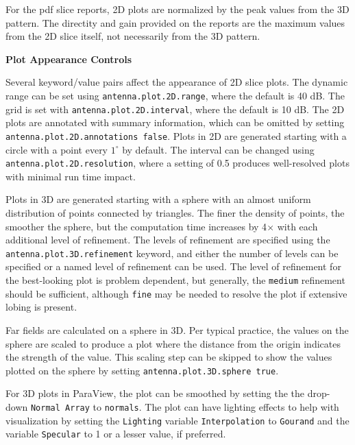 \documentclass[titlepage]{article}
\renewcommand\_{\textunderscore\linebreak[1]}
\begin{document}
For the pdf slice reports, 2D plots are normalized by the peak values from the 3D pattern.  The directity and gain provided on the reports are the maximum values from the 2D slice itself, not necessarily from the 3D pattern.\newline

\noindent \textbf{Plot Appearance Controls}\newline

Several keyword/value pairs affect the appearance of 2D slice plots.  The dynamic range can be set using \texttt{antenna.plot.2D.range}, where the default is 40 dB.  The grid is set with \texttt{antenna.plot.2D.interval}, where the default is 10 dB.  The 2D plots are annotated with summary information, which can be omitted by setting \texttt{antenna.plot.2D.annotations false}. Plots in 2D are generated starting with a circle with a point every $1^\circ$ by default.  The interval can be changed using \texttt{antenna.plot.2D.resolution}, where a setting of 0.5 produces well-resolved plots with minimal run time impact.

Plots in 3D are generated starting with a sphere with an almost uniform distribution of points connected by triangles.  The finer the density of points, the smoother the sphere, but the computation time increases by 4$\times$ with each additional level of refinement.  The levels of refinement are specified using the \texttt{antenna.plot.3D.refinement} keyword, and either the number of levels can be specified or a named level of refinement can be used.  The level of refinement for the best-looking plot is problem dependent, but generally, the \texttt{medium} refinement should be sufficient, although \texttt{fine} may be needed to resolve the plot if extensive lobing is present.

Far fields are calculated on a sphere in 3D.  Per typical practice, the values on the sphere are scaled to produce a plot where the distance from the origin indicates the strength of the value.  This scaling step can be skipped to show the values plotted on the sphere by setting \texttt{antenna.plot.3D.sphere true}.

For 3D plots in ParaView, the plot can be smoothed by setting the the drop-down \texttt{Normal Array} to \texttt{normals}.  The plot can have lighting effects to help with visualization by setting the \texttt{Lighting} variable \texttt{Interpolation} to \texttt{Gourand} and the variable \texttt{Specular} to 1 or a lesser value, if preferred.\newline
\end{document}

